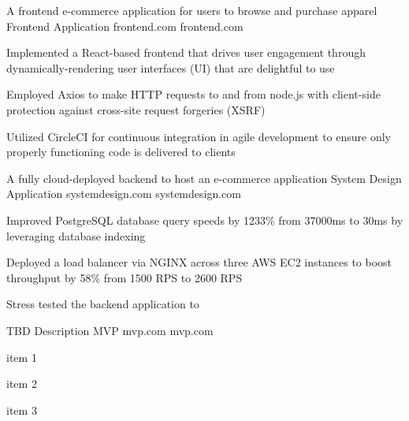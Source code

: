 

\begin{cventries}

  \cventry
    {A frontend e-commerce application for users to browse and purchase apparel} %
    {Frontend Application} %
    {frontend.com} %
    {frontend.com} %
    {
      \begin{cvitems} %
        \item {Implemented a React-based frontend that drives user engagement through dynamically-rendering user interfaces (UI) that are delightful to use}
        \item {Employed Axios to make HTTP requests to and from node.js with client-side protection against cross-site request forgeries (XSRF)}
        \item {Utilized CircleCI for continuous integration in agile development to ensure only properly functioning code is delivered to clients}
      \end{cvitems}
    }

  \cventry
    {A fully cloud-deployed backend to host an e-commerce application } %
    {System Design Application} %
    {systemdesign.com} %
    {systemdesign.com} %
    {
      \begin{cvitems} %
        \item {Improved PostgreSQL database query speeds by 1233\% from 37000ms to 30ms by leveraging database indexing}
        \item {Deployed a load balancer via NGINX across three AWS EC2 instances to boost throughput by 58\% from 1500 RPS to 2600 RPS}
        \item {Stress tested the backend application to }
      \end{cvitems}
    }

\cventry
{TBD Description} %
{MVP} %
{mvp.com} %
{mvp.com} %
{
  \begin{cvitems} %
    \item {item 1}
    \item {item 2}
    \item {item 3}
  \end{cvitems}
}


\end{cventries}
